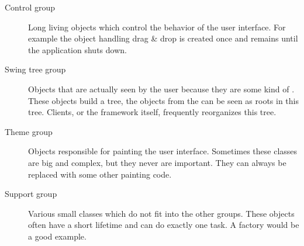\begin{description}
 \item[Control group] Long living objects which control the behavior of the user interface. For example the object handling drag \& drop is created once and remains until the application shuts down.
 \item[Swing tree group] Objects that are actually seen by the user because they are some kind of . These objects build a tree, the objects from the  can be seen as roots in this tree. Clients, or the framework itself, frequently reorganizes this tree.
 \item[Theme group] Objects responsible for painting the user interface. Sometimes these classes are big and complex, but they never are important. They can always be replaced with some other painting code.
 \item[Support group] Various small classes which do not fit into the other groups. These objects often have a short lifetime and can do exactly one task. A factory would be a good example.
\end{description}

